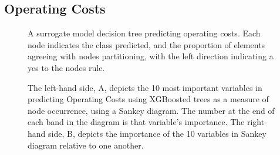\documentclass[review,12pt,authoryear]{elsarticle}
\begin{document}
\begin{linenumbers}
\subsection{Operating Costs}

\begin{figure} 
  \caption{A surrogate model decision tree predicting operating costs. Each node indicates the class predicted, and the proportion of elements agreeing with nodes partitioning, with the left direction indicating a yes to the nodes rule.}\label{fig:operating_tree}
 \end{figure}

\begin{figure}
  \caption{The left-hand side, A,  depicts the 10 most important variables in predicting Operating Costs using XGBoosted trees as a measure of node occurrence, using a Sankey diagram. The number at the end of each band in the diagram is that variable's importance. The right-hand side, B, depicts the importance of the 10 variables in Sankey diagram relative to one another.}\label{fig:operating_costs_sankey}
 \end{figure}
 

\end{linenumbers}
\end{document}

